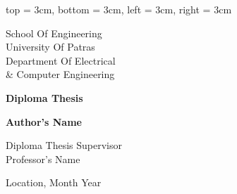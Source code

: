 \newgeometry
{
    top = 3cm,
    bottom = 3cm,
    left = 3cm,
    right = 3cm
}

\begin{center}

{\large School Of Engineering\\
University Of Patras\\[0.5cm]
Department Of Electrical\\
\& Computer Engineering}

\vspace{2cm}

{\large \textbf{Diploma Thesis}}

\vspace{2cm}

\EnglishThesisTitle

\vspace{2cm}

{\large \textbf{Author's Name}}

\vspace{2cm}


\vspace{2cm}

{\large Diploma Thesis Supervisor\\
Professor's Name}

\vspace{2cm}

{\large Location, Month Year}

\end{center}

\restoregeometry